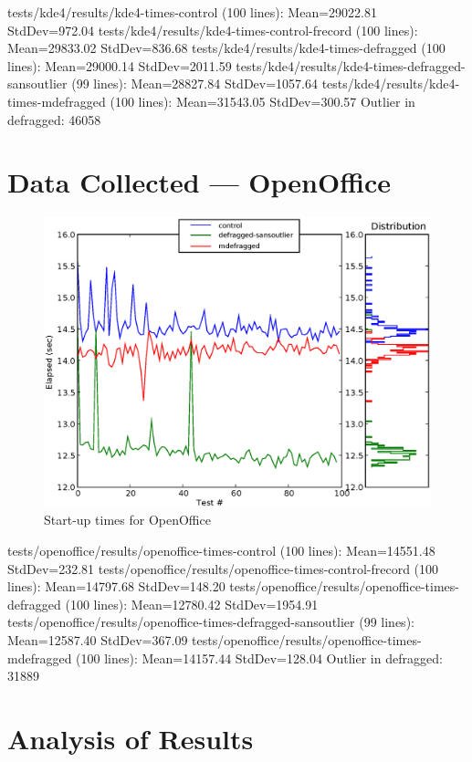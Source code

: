 \documentclass[10pt,twocolumn,letterpaper]{article}
\begin{document}
tests/kde4/results/kde4-times-control (100 lines):  Mean=29022.81  StdDev=972.04
tests/kde4/results/kde4-times-control-frecord (100 lines):  Mean=29833.02  StdDev=836.68
tests/kde4/results/kde4-times-defragged (100 lines):  Mean=29000.14  StdDev=2011.59
tests/kde4/results/kde4-times-defragged-sansoutlier (99 lines):  Mean=28827.84  StdDev=1057.64
tests/kde4/results/kde4-times-mdefragged (100 lines):  Mean=31543.05  StdDev=300.57
Outlier in defragged: 46058

\section{Data Collected --- OpenOffice}


\begin{figure}[!hbtp]
\includegraphics[scale=0.75]{openoffice-chart.eps}
\caption{Start-up times for OpenOffice}
\label{oochart}
\end{figure}

tests/openoffice/results/openoffice-times-control (100 lines):  Mean=14551.48  StdDev=232.81
tests/openoffice/results/openoffice-times-control-frecord (100 lines):  Mean=14797.68  StdDev=148.20
tests/openoffice/results/openoffice-times-defragged (100 lines):  Mean=12780.42  StdDev=1954.91
tests/openoffice/results/openoffice-times-defragged-sansoutlier (99 lines):  Mean=12587.40  StdDev=367.09
tests/openoffice/results/openoffice-times-mdefragged (100 lines):  Mean=14157.44  StdDev=128.04
Outlier in defragged: 31889

\section{Analysis of Results}
\end{document}
